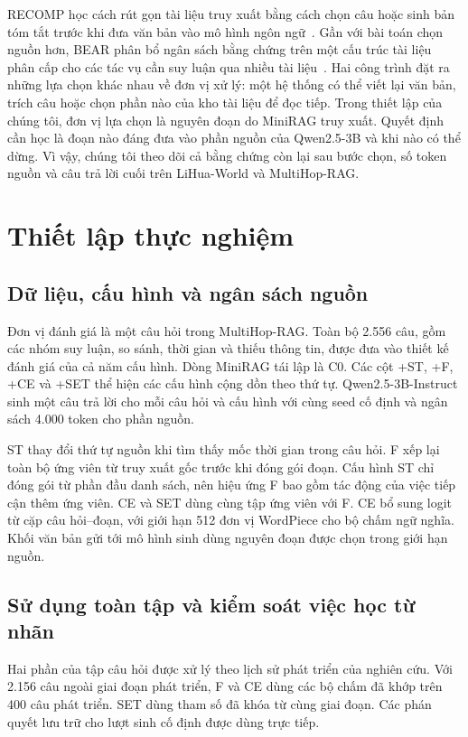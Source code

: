 RECOMP học cách rút gọn tài liệu truy xuất bằng cách chọn câu hoặc sinh bản tóm tắt trước khi đưa văn bản vào mô hình ngôn ngữ~\cite{xu2024recomp}. Gần với bài toán chọn nguồn hơn, BEAR phân bổ ngân sách bằng chứng trên một cấu trúc tài liệu phân cấp cho các tác vụ cần suy luận qua nhiều tài liệu~\cite{sun2026bear}. Hai công trình đặt ra những lựa chọn khác nhau về đơn vị xử lý: một hệ thống có thể viết lại văn bản, trích câu hoặc chọn phần nào của kho tài liệu để đọc tiếp. Trong thiết lập của chúng tôi, đơn vị lựa chọn là nguyên đoạn do MiniRAG truy xuất. Quyết định cần học là đoạn nào đáng đưa vào phần nguồn của Qwen2.5-3B và khi nào có thể dừng. Vì vậy, chúng tôi theo dõi cả bằng chứng còn lại sau bước chọn, số token nguồn và câu trả lời cuối trên LiHua-World và MultiHop-RAG.



\section{Thiết lập thực nghiệm}
\subsection{Dữ liệu, cấu hình và ngân sách nguồn}
Đơn vị đánh giá là một câu hỏi trong MultiHop-RAG. Toàn bộ 2.556 câu, gồm các nhóm suy luận, so sánh, thời gian và thiếu thông tin, được đưa vào thiết kế đánh giá của cả năm cấu hình. Dòng MiniRAG tái lập là C0. Các cột +ST, +F, +CE và +SET thể hiện các cấu hình cộng dồn theo thứ tự. Qwen2.5-3B-Instruct sinh một câu trả lời cho mỗi câu hỏi và cấu hình với cùng seed cố định và ngân sách 4.000 token cho phần nguồn.

ST thay đổi thứ tự nguồn khi tìm thấy mốc thời gian trong câu hỏi. F xếp lại toàn bộ ứng viên từ truy xuất gốc trước khi đóng gói đoạn. Cấu hình ST chỉ đóng gói từ phần đầu danh sách, nên hiệu ứng F bao gồm tác động của việc tiếp cận thêm ứng viên. CE và SET dùng cùng tập ứng viên với F. CE bổ sung logit từ cặp câu hỏi--đoạn, với giới hạn 512 đơn vị WordPiece cho bộ chấm ngữ nghĩa. Khối văn bản gửi tới mô hình sinh dùng nguyên đoạn được chọn trong giới hạn nguồn.

\subsection{Sử dụng toàn tập và kiểm soát việc học từ nhãn}
Hai phần của tập câu hỏi được xử lý theo lịch sử phát triển của nghiên cứu. Với 2.156 câu ngoài giai đoạn phát triển, F và CE dùng các bộ chấm đã khớp trên 400 câu phát triển. SET dùng tham số đã khóa từ cùng giai đoạn. Các phán quyết lưu trữ cho lượt sinh cố định được dùng trực tiếp.

